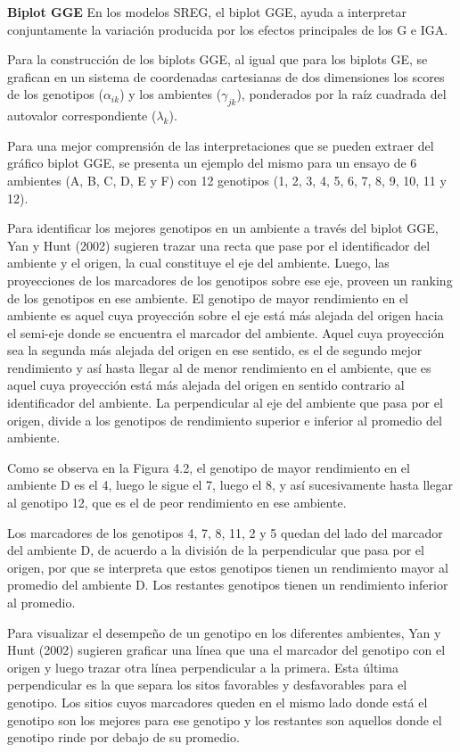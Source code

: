 \textbf{Biplot GGE}
En los modelos SREG, el biplot GGE, ayuda a interpretar conjuntamente la variación producida por los efectos principales de los G e IGA.

Para la construcción de los biplots GGE, al igual que para los biplots GE, se grafican en un sistema de coordenadas cartesianas de dos dimensiones los scores de los genotipos ($\alpha_{ik}$) y los ambientes ($\gamma_{jk}$), ponderados por la raíz cuadrada del autovalor correspondiente ($\lambda_k$).

Para una mejor comprensión de las interpretaciones que se pueden extraer del gráfico biplot GGE, se presenta un ejemplo del mismo para un ensayo de 6 ambientes (A, B, C, D, E y F) con 12 genotipos (1, 2, 3, 4, 5, 6, 7, 8, 9, 10, 11 y 12).


Para identificar los mejores genotipos en un ambiente a través del biplot GGE, Yan y Hunt (2002) sugieren trazar una recta que pase por el identificador del ambiente y el origen, la cual constituye el eje del ambiente. Luego, las proyecciones de los marcadores de los genotipos sobre ese eje, proveen un ranking de los genotipos en ese ambiente. El genotipo de mayor rendimiento en el ambiente es aquel cuya proyección sobre el eje está más alejada del origen hacia el semi-eje donde se encuentra el marcador del ambiente. Aquel cuya proyección sea la segunda más alejada del origen en ese sentido, es el de segundo mejor rendimiento y así hasta llegar al de menor rendimiento en el ambiente, que es aquel cuya proyección está más alejada del origen en sentido contrario al identificador del ambiente. La perpendicular al eje del ambiente que pasa por el origen, divide a los genotipos de rendimiento superior e inferior al promedio del ambiente.

Como se observa en la Figura 4.2, el genotipo de mayor rendimiento en el ambiente D es el 4, luego le sigue el 7, luego el 8, y así sucesivamente hasta llegar al genotipo 12, que es el de peor rendimiento en ese ambiente.

Los marcadores de los genotipos 4, 7, 8, 11, 2 y 5 quedan del lado del marcador del ambiente D, de acuerdo a la división de la perpendicular que pasa por el origen, por que se interpreta que estos genotipos tienen un rendimiento mayor al promedio del ambiente D. Los restantes genotipos tienen un rendimiento inferior al promedio.


Para visualizar el desempeño de un genotipo en los diferentes ambientes, Yan y Hunt (2002) sugieren graficar una línea que una el marcador del genotipo con el origen y luego trazar otra línea perpendicular a la primera. Esta última perpendicular es la que separa los sitos favorables y desfavorables para el genotipo. Los sitios cuyos marcadores queden en el mismo lado donde está el genotipo son los mejores para ese genotipo y los restantes son aquellos donde el genotipo rinde por debajo de su promedio.


